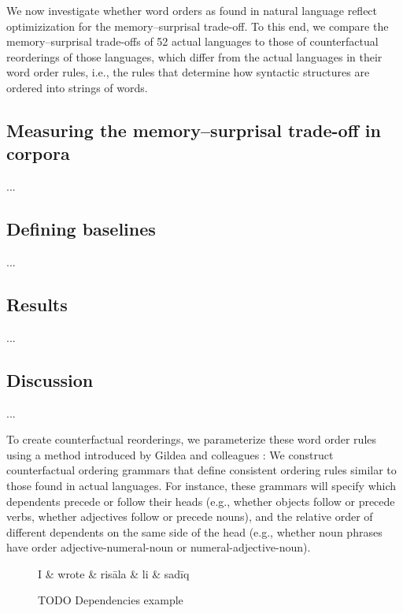 

We now investigate whether word orders as found in natural language reflect optimizization for the memory--surprisal trade-off.
To this end, we compare the memory--surprisal trade-offs of 52 actual languages to those of counterfactual reorderings of those languages, which differ from the actual languages in their word order rules, i.e., the rules that determine how syntactic structures are ordered into strings of words.

\subsection{Measuring the memory--surprisal trade-off in corpora}

...


\subsection{Defining baselines}

...


\subsection{Results}

...


\subsection{Discussion}

...

To create counterfactual reorderings, we parameterize these word order rules using a method introduced by Gildea and colleagues \citep{gildea-optimizing-2007, gildea-grammars-2010, gildea-human-2015}:
We construct counterfactual ordering grammars that define consistent ordering rules similar to those found in actual languages.
For instance, these grammars will specify which dependents precede or follow their heads (e.g., whether objects follow or precede verbs, whether adjectives follow or precede nouns), and the relative order of different dependents on the same side of the head (e.g., whether noun phrases have order adjective-numeral-noun or numeral-adjective-noun).

\begin{figure}
\centering
\begin{dependency}[theme = simple]
   \begin{deptext}[column sep=1em]
	   I \&	   wrote \& risāla \& li \& sadīq  \\
   \end{deptext}
\end{dependency}
	\caption{TODO Dependencies example}\label{fig:dependency}
\end{figure}


